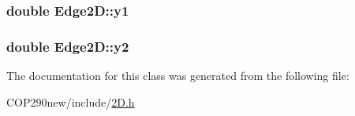 \subsubsection[{\texorpdfstring{y1}{y1}}]{\setlength{\rightskip}{0pt plus 5cm}double Edge2\+D\+::y1}\hypertarget{class_edge2_d_a0d93b3f558f7faa717389bd3208f5f67}{}\label{class_edge2_d_a0d93b3f558f7faa717389bd3208f5f67}
\subsubsection[{\texorpdfstring{y2}{y2}}]{\setlength{\rightskip}{0pt plus 5cm}double Edge2\+D\+::y2}\hypertarget{class_edge2_d_a9d8863dcde07985fe52d9ed3a8d80b4d}{}\label{class_edge2_d_a9d8863dcde07985fe52d9ed3a8d80b4d}


The documentation for this class was generated from the following file\+:\begin{DoxyCompactItemize}
\item 
C\+O\+P290new/include/\hyperlink{2_d_8h}{2\+D.\+h}\end{DoxyCompactItemize}
